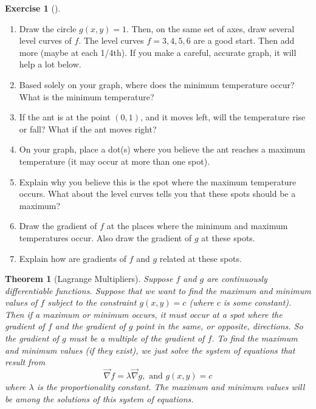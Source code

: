 \documentclass[10pt,]{book}
\theoremstyle{plain}
\newtheorem{theorem}{Theorem}[section]
\theoremstyle{definition}
\theoremstyle{definition}
\theoremstyle{definition}
\theoremstyle{definition}
\newtheorem{exploration}[project]{Exercise}
\theoremstyle{definition}
\numberwithin{equation}{section}
\begin{document}
\begin{exploration}[]\label{exploration-241}
\leavevmode%
\begin{enumerate}[font=\bfseries,label=(\alph*),ref=\alph*]
\item\label{task-650} Draw the circle \(g(x,y)=1\).  Then, on the same set of axes, draw several level curves of \(f\). The level curves \(f=3, 4, 5, 6\) are a good start. Then add more (maybe at each 1/4th). If you make a careful, accurate graph, it will help a lot below.%
\item\label{task-651} Based solely on your graph, where does the minimum temperature occur?  What is the minimum temperature?%
\item\label{task-652} If the ant is at the point \((0,1)\), and it moves left, will the temperature rise or fall?  What if the ant moves right?%
\item\label{task-653} On your graph, place a dot(s) where you believe the ant reaches a maximum temperature (it may occur at more than one spot).%
\item\label{task-654} Explain why you believe this is the spot where the maximum temperature occurs. What about the level curves tells you that these spots should be a maximum?%
\item\label{task-655} Draw the gradient of \(f\) at the places where the minimum and maximum temperatures occur. Also draw the gradient of \(g\) at these spots.%
\item\label{task-656} Explain how are gradients of \(f\) and \(g\) related at these spots.%
\end{enumerate}
\end{exploration}
\begin{theorem}[{Lagrange Multipliers}]\label{theorem-9}
Suppose \(f\) and \(g\) are continuously differentiable functions. Suppose that we want to find the maximum and minimum values of \(f\) subject to the constraint \(g(x,y)=c\) (where \(c\) is some constant). Then if a maximum or minimum occurs, it must occur at a spot where the gradient of \(f\) and the gradient of \(g\) point in the same, or opposite, directions. So the gradient of \(g\) must be a multiple of the gradient of \(f\). To find the maximum and minimum values (if they exist), we just solve the system of equations that result from%
\begin{equation*}
\vec \nabla f = \lambda \vec \nabla g, \text{ and }  g(x,y)=c
\end{equation*}
where \(\lambda\) is the proportionality constant. The maximum and minimum values will be among the solutions of this system of equations.%
\end{theorem}
\end{document}
